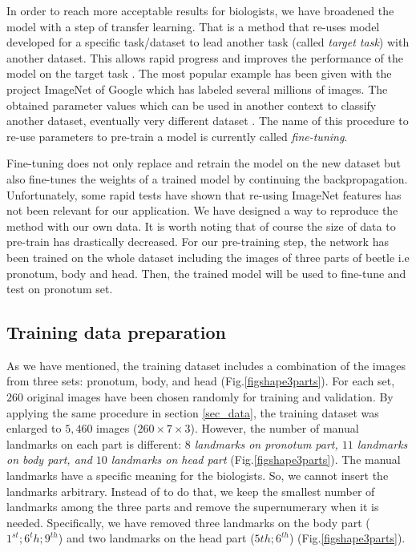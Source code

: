 \documentclass[10pt]{article}
\begin{document}
In order to reach more acceptable results for biologists, we have
broadened the model with a step of transfer learning. That is a
method that re-uses model developed for a specific task/dataset
to lead another task (called \textit{target task}) with another dataset. This allows rapid progress and improves the performance of the model on the target task \cite{torrey2009transfer}. The most popular
example has been given with the project ImageNet of Google \cite{imagenet_cvpr09} which has labeled several millions of images. The obtained parameter values which can
be used in another context to classify another dataset, eventually
very different dataset \cite{margeta_mri}. The name of this procedure to re-use parameters
to pre-train a model is currently called \textit{fine-tuning}.

Fine-tuning does not only replace and retrain the model on the new
dataset but also fine-tunes the weights of a trained model by continuing the
backpropagation. Unfortunately, some rapid tests have shown that
re-using ImageNet features has not been relevant for our
application. We have designed a way to reproduce the method with our
own data. It is worth noting that of course the size of data to pre-train has drastically decreased. For our pre-training step, the network has been trained on the whole dataset including the images of three parts of beetle i.e pronotum, body and head. Then,
the trained model will be used to fine-tune and test on pronotum set.


\subsection{Training data preparation}
As we have mentioned, the training dataset includes a combination of the images from three
sets: pronotum, body, and head (Fig.\ref{figshape3parts}). For each
set, $260$ original images have been chosen randomly for training and
validation. By applying the same procedure in section \ref{sec_data},
the training dataset was enlarged to $5,460$ images ($260 \times 7
\times 3$). However, the number of manual landmarks on each part is
different: \textit{$8$ landmarks on pronotum part, $11$ landmarks on
  body part, and $10$ landmarks on head part} (Fig.\ref{figshape3parts}). The manual landmarks
have a specific meaning for the biologists. So, we cannot insert the
landmarks arbitrary. Instead of to do that, we keep the smallest number of
landmarks among the three parts and remove the supernumerary when it is needed. Specifically, we have removed three landmarks on the body part
($1^{st}; 6^{t}h; 9^{th}$) and two landmarks on the head part ($5{th};
6^{th}$) (Fig.\ref{figshape3parts}).
\end{document}
